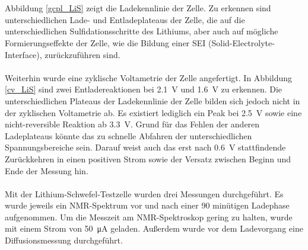 \documentclass[a4paper, 11pt, headsepline,footsepline,twoside,abstract]{scrbook}
\begin{document}
\\\\
Abbildung \ref{gcpl_LiS} zeigt die Ladekennlinie der Zelle. Zu erkennen sind unterschiedlichen Lade- und Entladeplateaus der Zelle, die auf die unterschiedlichen Sulfidationsschritte des Lithiums, aber auch auf mögliche Formierungseffekte der Zelle, wie die Bildung einer SEI (Solid-Electrolyte-Interface), zurückzuführen sind.
\\\\
Weiterhin wurde eine zyklische Voltametrie der Zelle angefertigt. In Abbildung \ref{cv_LiS} sind zwei Entladereaktionen bei \SI{2.1}{\volt} und \SI{1.6}{\volt} zu erkennen. Die unterschiedlichen Plateaus der Ladekennlinie der Zelle bilden sich jedoch nicht in der zyklischen Voltametrie ab. Es existiert lediglich ein Peak bei \SI{2,5}{\volt} sowie eine nicht-reversible Reaktion ab \SI{3.3}{\volt}. Grund für das Fehlen der anderen Ladeplateaus könnte das zu schnelle Abfahren der unterschiedlichen Spannungsbereiche sein. Darauf weist auch das erst nach \SI{0.6}{\volt} stattfindende Zurückkehren in einen positiven Strom sowie der Versatz zwischen Beginn und Ende der Messung hin. 
\\\\
Mit der Lithium-Schwefel-Testzelle wurden drei Messungen durchgeführt. Es wurde jeweils ein NMR-Spektrum vor und nach einer 90 minütigen Ladephase aufgenommen. Um die Messzeit am NMR-Spektroskop gering zu halten, wurde mit einem Strom von \SI{50}{\micro\ampere} geladen. Außerdem wurde vor dem Ladevorgang eine Diffusionsmessung durchgeführt.
\end{document}
